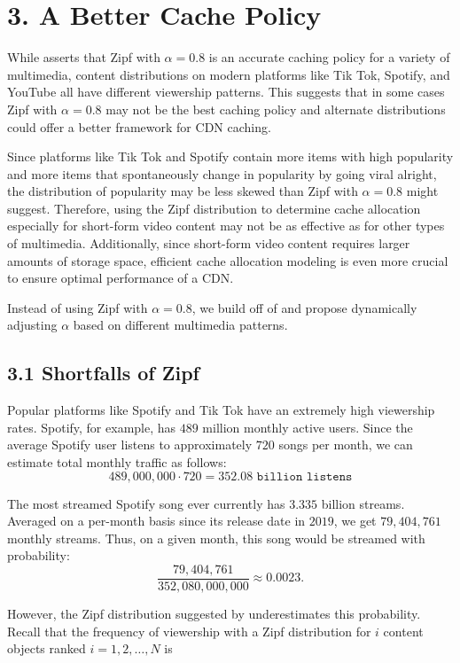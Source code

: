 \documentclass[
	a4paper, %
	10pt, %
	unnumberedsections, %
	twoside, %
]{LTJournalArticle}
\begin{document}
\section{3. A Better Cache Policy}

While \cite{biancoCDNs2017} asserts that Zipf with $\alpha = 0.8$ is an accurate caching policy for a variety of multimedia, content distributions on modern platforms like Tik Tok, Spotify, and YouTube all have different viewership patterns. This suggests that in some cases Zipf with $\alpha = 0.8$ may not be the best caching policy and alternate distributions could offer a better framework for CDN caching. 

Since platforms like Tik Tok and Spotify contain more items with high popularity and more items that spontaneously change in popularity by going viral alright, the distribution of popularity may be less skewed than Zipf with $\alpha = 0.8$ might suggest. Therefore, using the Zipf distribution to determine cache allocation especially for short-form video content may not be as effective as for other types of multimedia. Additionally, since short-form video content requires larger amounts of storage space, efficient cache allocation modeling is even more crucial to ensure optimal performance of a CDN. 

Instead of using Zipf with $\alpha = 0.8$, we build off of \cite{osmanthesis} and propose dynamically adjusting $\alpha$ based on different multimedia patterns. 

\subsection{3.1 Shortfalls of Zipf}

Popular platforms like Spotify and Tik Tok have an extremely high viewership rates. Spotify, for example, has $489$ million monthly active users. Since the average Spotify user listens to approximately $720$ songs per month, we can estimate total monthly traffic as follows: 
\[
	489,000,000 \cdot 720 = 352.08 \texttt{ billion listens}
\]  
	
The most streamed Spotify song ever currently has $3.335$ billion streams. Averaged on a per-month basis since its release date in $2019$, we get $79,404,761$ monthly streams. Thus, on a given month, this song would be streamed with probability: 
\[
	\frac{79,404,761}{352,080,000,000} \approx 0.0023.
\] 

However, the Zipf distribution suggested by \cite{biancoCDNs2017} underestimates this probability. Recall that the frequency of viewership with a Zipf distribution for $i$ content objects ranked $i = 1, 2, \ldots, N$ is
\end{document}
